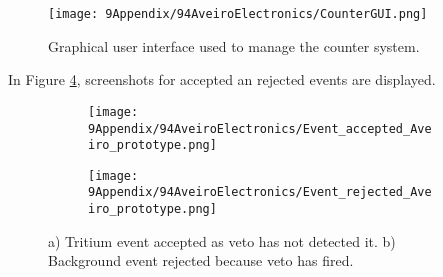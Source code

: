 \begin{enumerate}
 \begin{figure}[h]
\centering
\texttt{[image: 9Appendix/94AveiroElectronics/CounterGUI.png]}
\caption{Graphical user interface used to manage the counter system. \label{fig:GUIcounts}}
\end{figure}



In Figure \ref{fig:ScreenshotElectronic}, screenshots for accepted an rejected events are displayed.


\begin{figure}
\centering
    \begin{subfigure}[b]{0.42\textwidth}
    \centering
    \texttt{[image: 9Appendix/94AveiroElectronics/Event\_accepted\_Aveiro\_prototype.png]}  
    \caption{\label{subfig:TrueTritiumEvent}}
    \end{subfigure}
    \hfill
    \begin{subfigure}[b]{0.42\textwidth}
    \centering
    \texttt{[image: 9Appendix/94AveiroElectronics/Event\_rejected\_Aveiro\_prototype.png]}  
    \caption{\label{subfig:FalseTritiumEvent}}
    \end{subfigure}
 \caption{a) Tritium event accepted as veto has not detected it. b) Background event rejected because veto has fired.}
 \label{fig:ScreenshotElectronic}
\end{figure}


\end{enumerate}